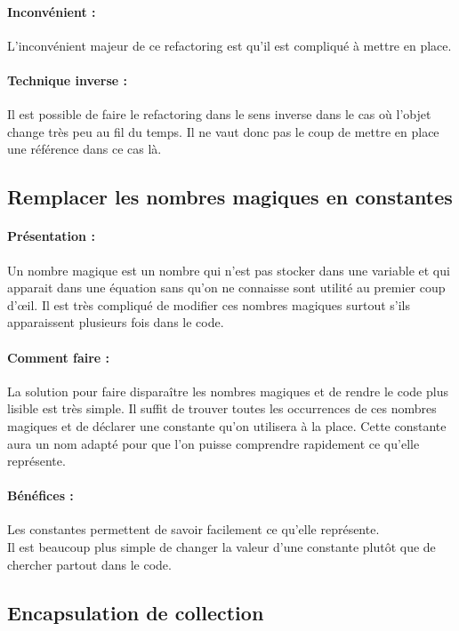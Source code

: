 \documentclass[a4paper,twoside,12pt,openright]{report}
\begin{document}
\paragraph{Inconvénient :}
L'inconvénient majeur de ce refactoring est qu'il est compliqué à mettre en place.

\paragraph{Technique inverse :}
Il est possible de faire le refactoring dans le sens inverse dans le cas où l'objet change très peu au fil du temps. Il ne vaut donc pas le coup de mettre en place une référence dans ce cas là.\\


\subsection{Remplacer les nombres magiques en constantes}
\paragraph{Présentation :}
Un nombre magique est un nombre qui n'est pas stocker dans une variable et qui apparait dans une équation sans qu'on ne connaisse sont utilité au premier coup d'œil. Il est très compliqué de modifier ces nombres magiques surtout s'ils apparaissent plusieurs fois dans le code.

\paragraph{Comment faire :}
La solution pour faire disparaître les nombres magiques et de rendre le code plus lisible est très simple. Il suffit de trouver toutes les occurrences de ces nombres magiques et de déclarer une constante qu'on utilisera à la place. Cette constante aura un nom adapté pour que l'on puisse comprendre rapidement ce qu'elle représente.

\paragraph{Bénéfices :}
Les constantes permettent de savoir facilement ce qu'elle représente.\\
Il est beaucoup plus simple de changer la valeur d'une constante plutôt que de chercher partout dans le code.\\

\subsection{Encapsulation de collection}
\end{document}
